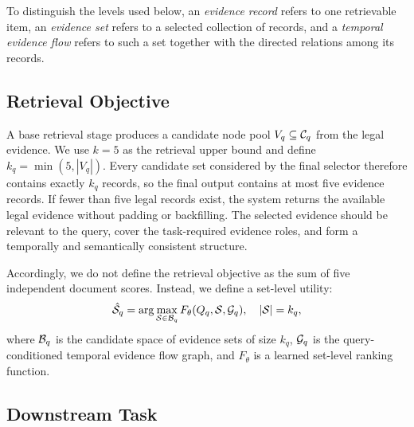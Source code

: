 To distinguish the levels used below, an \emph{evidence record} refers to one retrievable item, an \emph{evidence set} refers to a selected collection of records, and a \emph{temporal evidence flow} refers to such a set together with the directed relations among its records.

\subsection{Retrieval Objective}

A base retrieval stage produces a candidate node pool \(V_q\subseteq\mathcal{C}_q\) from the legal evidence. We use $k=5$ as the retrieval upper bound and define $k_q=\min(5,|V_q|)$. Every candidate set considered by the final selector therefore contains exactly $k_q$ records, so the final output contains at most five evidence records. If fewer than five legal records exist, the system returns the available legal evidence without padding or backfilling. The selected evidence should be relevant to the query, cover the task-required evidence roles, and form a temporally and semantically consistent structure.

Accordingly, we do not define the retrieval objective as the sum of five independent document scores. Instead, we define a set-level utility:
\begin{equation}
\hat{\mathcal{S}}_q
=
\arg\max_{\mathcal{S}\in\mathcal{B}_q}
F_{\theta}(Q_q,\mathcal{S},\mathcal{G}_q),
\quad |\mathcal{S}|=k_q,
\label{eq:set_selection}
\end{equation}
where $\mathcal{B}_q$ is the candidate space of evidence sets of size $k_q$, $\mathcal{G}_q$ is the query-conditioned temporal evidence flow graph, and $F_{\theta}$ is a learned set-level ranking function.

\subsection{Downstream Task}

